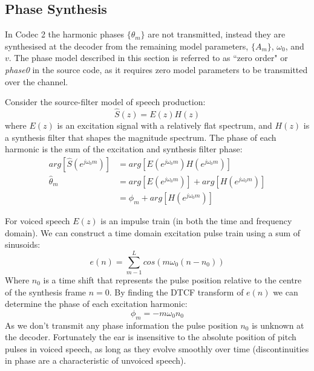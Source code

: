 \documentclass{article}
\begin{document}
\subsection{Phase Synthesis}

In Codec 2 the harmonic phases $\{\theta_m\}$ are not transmitted, instead they are synthesised at the decoder from the remaining model parameters, $\{A_m\}$, $\omega_0$, and $v$.  The phase model described in this section is referred to as ``zero order" or \emph{phase0} in the source code, as it requires zero model parameters to be transmitted over the channel.

Consider the source-filter model of speech production:
\begin{equation}
\label{eq:source_filter}
\hat{S}(z)=E(z)H(z)
\end{equation}
where $E(z)$ is an excitation signal with a relatively flat spectrum, and $H(z)$ is a synthesis filter that shapes the magnitude spectrum.  The phase of each harmonic is the sum of the excitation and synthesis filter phase:
\begin{equation}
\begin{split}
arg \left[ \hat{S}(e^{j \omega_0 m}) \right] &= arg \left[ E(e^{j \omega_0 m}) H(e^{j \omega_0 m}) \right] \\
\hat{\theta}_m &= arg \left[ E(e^{j \omega_0 m}) \right] + arg \left[ H(e^{j \omega_0 m}) \right] \\
&= \phi_m +  arg \left[ H(e^{j \omega_0 m}) \right]
\end{split}
\end{equation}

For voiced speech $E(z)$ is an impulse train (in both the time and frequency domain). We can construct a time domain excitation pulse train using a sum of sinusoids:
\begin{equation}
e(n) = \sum_{m-1}^L cos( m \omega_0 (n - n_0))
\end{equation}
Where $n_0$ is a time shift that represents the pulse position relative to the centre of the synthesis frame $n=0$. By finding the DTCF transform of $e(n)$ we can determine the phase of each excitation harmonic:
\begin{equation}
\phi_m = - m \omega_0 n_0
\end{equation}
As we don't transmit any phase information the pulse position $n_0$ is unknown at the decoder.  Fortunately the ear is insensitive to the absolute position of pitch pulses in voiced speech, as long as they evolve smoothly over time (discontinuities in phase are a characteristic of unvoiced speech).
\end{document}
